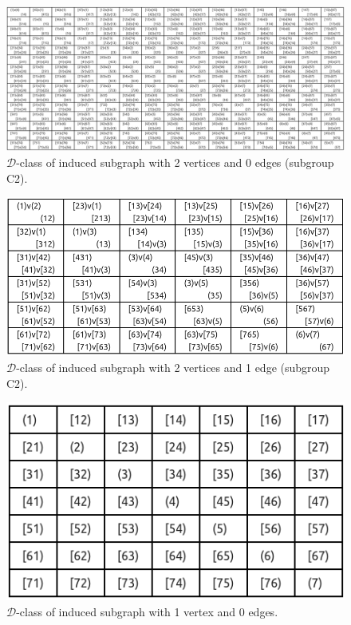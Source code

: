 \begin{appendices}
\begin{figure}[H]
\includegraphics[width=\textwidth, keepaspectratio]{images/x9/x9_2v_0e.png}
\caption{$\mathcal{D}$-class of induced subgraph with 2 vertices and 0 edges (subgroup C2).}
\end{figure}

\begin{figure}[H]
\includegraphics[scale=0.15]{images/x9/x9_2v_1e.png}
\caption{$\mathcal{D}$-class of induced subgraph with 2 vertices and 1 edge (subgroup C2).}
\end{figure}

\begin{figure}[H]
\includegraphics[scale=0.2]{images/x9/x9_1v_0e.png}
\caption{$\mathcal{D}$-class of induced subgraph with 1 vertex and 0 edges.}
\end{figure}

\end{appendices}